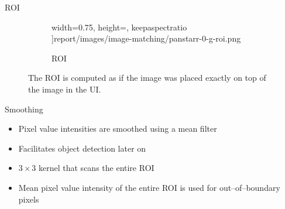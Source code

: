 \begin{frame}{ROI}
\begin{figure}[H]
\begin{subfigure}{.5\textwidth}
                width=0.75\textwidth,
                height=\textheight,
                keepaspectratio
          ]{report/images/image-matching/panstarr-0-g-roi.png}
          \caption{\panstarrs ROI}
        \end{subfigure}
        \caption{The ROI is computed as if the \panstarrs image was placed exactly on top of the \usno image in the UI.}
    \end{figure}
\end{frame}

\begin{frame}{Smoothing}
    \begin{itemize}
        \item Pixel value intensities are smoothed using a mean filter
        \item Facilitates object detection later on
        \item $3 \times 3$ kernel that scans the entire ROI
        \item Mean pixel value intensity of the entire ROI is used for out--of--boundary pixels
    \end{itemize}
\end{frame}

